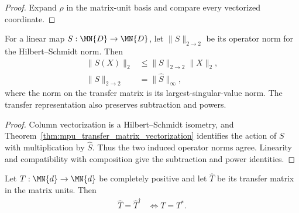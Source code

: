 \begin{proof}\leanok
    Expand $\rho$ in the matrix-unit basis and compare every vectorized
    coordinate.
\end{proof}

\begin{theorem}
    \label{thm:transfer_matrix_hilbert_schmidt_operator_norm}
    \leanok
    For a linear map $S:\MN{D}\to\MN{D}$, let
    $\lVert S\rVert_{2\to2}$ be its operator norm for the
    Hilbert--Schmidt norm. Then
    \begin{align}
        \lVert S(X)\rVert_2
        &\leq \lVert S\rVert_{2\to2}\lVert X\rVert_2,\\
        \lVert S\rVert_{2\to2}
        &=\lVert\widehat S\rVert_\infty,
    \end{align}
    where the norm on the transfer matrix is its largest-singular-value
    norm. The transfer representation also preserves subtraction and powers.
\end{theorem}

\begin{proof}\leanok
    Column vectorization is a Hilbert--Schmidt isometry, and
    Theorem~\ref{thm:mpu_transfer_matrix_vectorization} identifies the action
    of $S$ with multiplication by $\widehat S$. Thus the two induced operator
    norms agree. Linearity and compatibility with composition give the
    subtraction and power identities.
\end{proof}

\begin{lemma}
    \label{lem:transfer_matrix_units_hermitian_iff}
    \leanok
    Let $T:\MN{d}\to\MN{d}$ be completely positive and let $\widehat T$ be its
    transfer matrix in the matrix units. Then
    \begin{align}
        \widehat T=\widehat T^\dagger
        &\iff T=T^*.
    \end{align}
\end{lemma}

